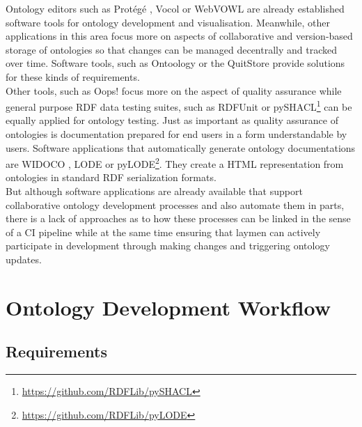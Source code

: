 \documentclass[sigconf]{acmart}
\begin{document}
Ontology editors such as Protégé \cite{protege}, Vocol \cite{halilaj} or WebVOWL \cite{lohmann} are already established software tools for ontology development and visualisation. Meanwhile, other applications in this area focus more on aspects of collaborative and version-based storage of ontologies so that changes can be managed decentrally and tracked over time. Software tools, such as Ontoology \cite{alobaid} or the QuitStore \cite{arndt} provide solutions for these kinds of requirements.\\
Other tools, such as Oops! focus more on the aspect of quality assurance \cite{poveda} while general purpose RDF data testing suites, such as RDFUnit \cite{rdfunit} or pySHACL\footnote{\url{https://github.com/RDFLib/pySHACL}} can be equally applied for ontology testing. Just as important as quality assurance of ontologies is documentation prepared for end users in a form understandable by users. Software applications that automatically generate ontology documentations are WIDOCO \cite{widoco}, LODE \cite{lode} or pyLODE\footnote{\url{https://github.com/RDFLib/pyLODE}}. They create a HTML representation from ontologies in standard RDF serialization formats.\\
But although software applications are already available that support collaborative ontology development processes and also automate them in parts, there is a lack of approaches as to how these processes can be linked in the sense of a CI pipeline while at the same time ensuring that laymen can actively participate in development through making changes and triggering ontology updates.

\section{Ontology Development Workflow}
\label{sec:ontoflow}
\subsection{Requirements}
\end{document}
